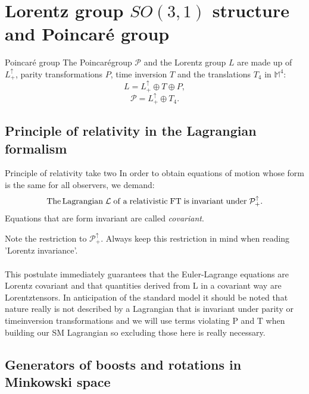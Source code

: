 \section{Lorentz group $SO(3,1)$ structure and Poincaré group}

\begin{mybox}{Poincaré group}
	The Poincarégroup $\mathcal{P}$ and the Lorentz group $L$ are made up of $L^\uparrow_+$, parity transformations $P$, time inversion $T$ and the translations $T_4$ in $\mathbb{M}^4$:
	\begin{equation}
	\label{eq:lorentzgroupwhole}
	L = L^\uparrow_+ \oplus T \oplus P,
	\end{equation}
	\begin{equation}
	\label{eq:poincaregroup}
	\mathcal{P}=L^\uparrow_+ \oplus T_4.
	\end{equation}
\end{mybox}

\subsection{Principle of relativity in the Lagrangian formalism }
\begin{mybox}{Principle of relativity take two}
	In order to obtain equations of motion whose form is the same for all observers, we demand:
	\begin{equation}
	\mathrm{The\, Lagrangian \; \mathcal{L} \;of \;a \;relativistic\; FT\; is\; invariant \;under \;\mathcal{P}^\uparrow_+}.
		\end{equation}
		Equations that are form invariant are called \emph{covariant}.
	\end{mybox}
	Note the restriction to $\mathcal{P}^\uparrow_+$. Always keep this restriction in mind when reading ’Lorentz invariance’.
	\\
	\\
	This postulate immediately guarantees that the Euler-Lagrange equations are Lorentz covariant
	and that quantities derived from L in a covariant way are Lorentztensors.
	In anticipation of the standard model it should be noted that nature really is not described by a
	Lagrangian that is invariant under parity or timeinversion transformations and we will use terms
	violating P and T when building our SM Lagrangian so excluding those here is really necessary.
\subsection{Generators of boosts and rotations in Minkowski space}


























